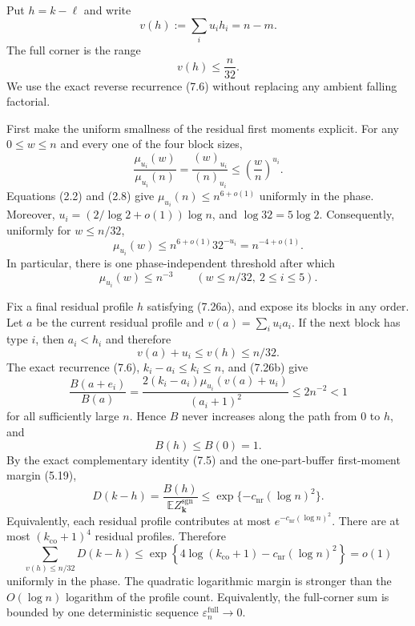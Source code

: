 

Put $h=k-\ell$ and write
\[
  v(h):=\sum_i u_i h_i=n-m.
\]
The full corner is the range
\begin{equation*}
  v(h)\le\frac n{32}.
  \tag{7.26a}
\end{equation*}
We use the exact reverse recurrence (7.6) without replacing any ambient
falling factorial.

First make the uniform smallness of the residual first moments explicit. For
any $0\le w\le n$ and every one of the four block sizes,
\[
  \frac{\mu_{u_i}(w)}{\mu_{u_i}(n)}
  =\frac{(w)_{u_i}}{(n)_{u_i}}
  \le\left(\frac wn\right)^{u_i}.
\]
Equations (2.2) and (2.8) give
$\mu_{u_i}(n)\le n^{6+o(1)}$ uniformly in the phase. Moreover,
$u_i=(2/\log 2+o(1))\log n$, and
$\log 32=5\log 2$. Consequently, uniformly for $w\le n/32$,
\begin{equation*}
  \mu_{u_i}(w)
  \le
  n^{6+o(1)}32^{-u_i}
  =n^{-4+o(1)}.
  \tag{7.26}
\end{equation*}
In particular, there is one phase-independent threshold after which
\begin{equation*}
  \mu_{u_i}(w)\le n^{-3}
  \qquad
  (w\le n/32,\ 2\le i\le5).
  \tag{7.26b}
\end{equation*}

Fix a final residual profile $h$ satisfying (7.26a), and expose its blocks in
any order. Let $a$ be the current residual profile and
$v(a)=\sum_i u_i a_i$. If the next block has type $i$, then
$a_i<h_i$ and therefore
\[
  v(a)+u_i\le v(h)\le n/32.
\]
The exact recurrence (7.6), $k_i-a_i\le k_i\le n$, and (7.26b) give
\[
  \frac{B(a+e_i)}{B(a)}
  =
  \frac{2(k_i-a_i)\mu_{u_i}(v(a)+u_i)}{(a_i+1)^2}
  \le2n^{-2}<1
\]
for all sufficiently large $n$. Hence $B$ never increases along the path from
$0$ to $h$, and
\begin{equation*}
  B(h)\le B(0)=1.
  \tag{7.27a}
\end{equation*}
By the exact complementary identity (7.5) and the one-part-buffer first-moment
margin (5.19),
\begin{equation*}
  D(k-h)
  =\frac{B(h)}{\mathbb E Z_{\mathbf k}^{\mathrm{sgn}}}
  \le
  \exp\{-c_{\mathrm{nr}}(\log n)^2\}.
  \tag{7.27}
\end{equation*}
Equivalently, each residual profile contributes at most
$e^{-c_{\mathrm{nr}}(\log n)^2}$.
There are at most $(k_{\mathrm{co}}+1)^4$ residual profiles. Therefore
\[
  \sum_{v(h)\le n/32}D(k-h)
  \le
  \exp\!\left\{
    4\log(k_{\mathrm{co}}+1)-c_{\mathrm{nr}}(\log n)^2
  \right\}
  =o(1)
\]
uniformly in the phase. The quadratic logarithmic margin is stronger than the
$O(\log n)$ logarithm of the profile count. Equivalently, the full-corner sum
is bounded by one deterministic sequence
$\varepsilon_n^{\mathrm{full}}\to0$.

